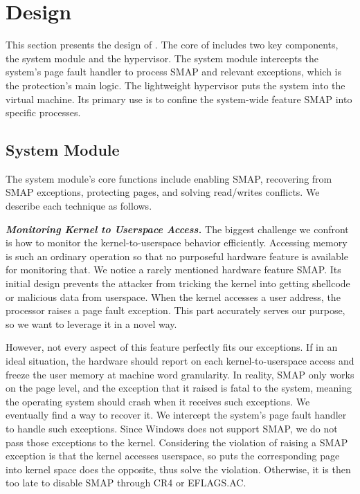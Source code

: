 
\section{\name Design}
\label{sec:ktoctou-design}

This section presents the design of \name.  The core of \name includes two key components, the system module and the hypervisor. The system module intercepts the system's page fault handler to process SMAP and relevant exceptions, which is the protection's main logic. The lightweight hypervisor puts the system into the virtual machine. Its primary use is to confine the system-wide feature SMAP into specific processes.

\subsection{System Module}

The system module's core functions include enabling SMAP, recovering from SMAP exceptions, protecting pages, and solving read/writes conflicts. We describe each technique as follows.


\textbf{\textit{Monitoring Kernel to Userspace Access. }} The biggest challenge we confront is how to monitor the kernel-to-userspace behavior efficiently. Accessing memory is such an ordinary operation so that no purposeful hardware feature is available for monitoring that.  We notice a rarely mentioned hardware feature SMAP. Its initial design prevents the attacker from tricking the kernel into getting shellcode or malicious data from userspace. When the kernel accesses a user address, the processor raises a page fault exception. This part accurately serves our purpose, so we want to leverage it in a novel way.

However, not every aspect of this feature perfectly fits our exceptions. If in an ideal situation, the hardware should report on each kernel-to-userspace access and freeze the user memory at machine word granularity. In reality, SMAP only works on the page level, and the exception that it raised is fatal to the system, meaning the operating system should crash when it receives such exceptions.  We eventually find a way to recover it. We intercept the system's page fault handler to handle such exceptions. Since Windows does not support SMAP, we do not pass those exceptions to the kernel. Considering the violation of raising a SMAP exception is that the kernel accesses userspace, so puts the corresponding page into kernel space does the opposite, thus solve the violation. Otherwise, it is then too late to disable SMAP through CR4 or EFLAGS.AC.


